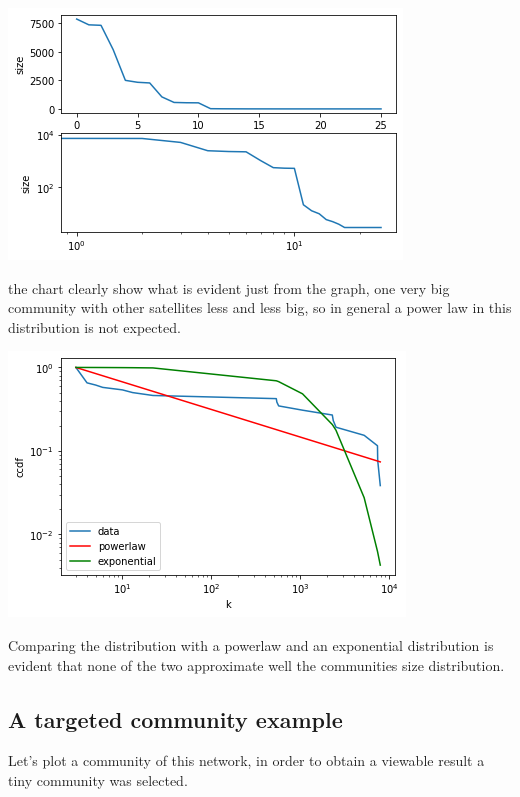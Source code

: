 \documentclass[]{article}
\begin{document}
    \begin{center}
        \includegraphics[scale=0.5]{charts/comm_size_dist.png}
    \end{center}
    the chart clearly show what is evident just from the graph, one very big community with other satellites less and less big, so in general a power law in this distribution is not expected.
    \begin{center}
        \includegraphics[scale=0.5]{charts/comms_size_powerlaw.png}
    \end{center}
    Comparing the distribution with a powerlaw and an exponential distribution is evident that none of the two approximate well the communities size distribution. 

    \subsection*{A targeted community example}
    Let's plot a community of this network, in order to obtain a viewable result a tiny community was selected.
\end{document}
